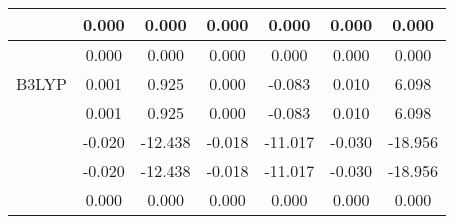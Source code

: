 \begin{tabular}{|c| c |c | c | c | c | c |}
                                                                                   & 0.000                                            & 0.000                                        & 0.000                                            & 0.000                                      & 0.000                                            & 0.000                  \\ \hline
                                                                                   & 0.000                                            & 0.000                                        & 0.000                                            & 0.000                                      & 0.000                                            & 0.000                  \\ \hline
    \multicolumn{1}{|c|}{ B3LYP}                               & 0.001                                            & 0.925                                        & 0.000                                            & -0.083                                     & 0.010                                            & 6.098                  \\ \hline
                                                                                   & 0.001                                            & 0.925                                        & 0.000                                            & -0.083                                     & 0.010                                            & 6.098                  \\ \hline
                                                                                   & -0.020                                           & -12.438                                      & -0.018                                           & -11.017                                    & -0.030                                           & -18.956                \\ \hline
                                                                                   &   -0.020 & -12.438                                      &   -0.018 & -11.017                                    &   -0.030 & -18.956                \\ \hline
                                                                                   & 0.000                                            & 0.000                                        & 0.000                                            & 0.000                                      & 0.000                                            & 0.000                  \\ \hline

\end{tabular}
